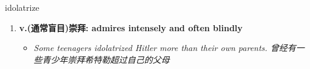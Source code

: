 
\begin{frame}
{\huge idolatrize}
\begin{center}
\begin{enumerate}\Large
  \item \textbf{v.(通常盲目)崇拜: admires intensely and often blindly}
  \begin{itemize}
    \item \em{\Large{Some teenagers idolatrized Hitler more than their own parents. 曾经有一些青少年崇拜希特勒超过自己的父母}}
  \end{itemize}
\end{enumerate}
\end{center}
\end{frame}
